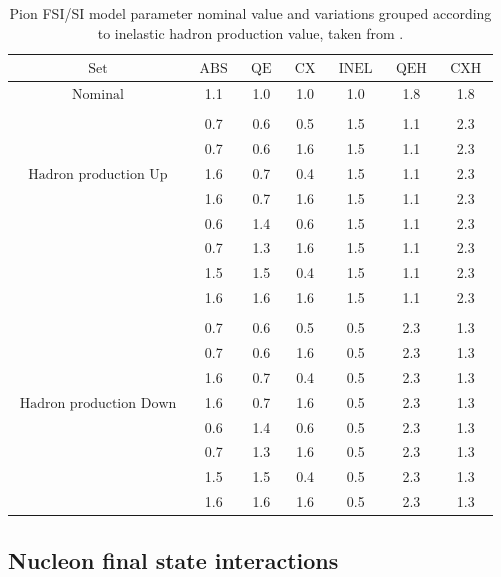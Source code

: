 \begin{table}
\centering
\begin{tabular}{||ccccccc||}
\hline
$\text { Set }$ & $\text { ABS }$ & $\text { QE }$ & $\text { CX }$ & $\text { INEL }$ & $\text { QEH }$ & $\text { CXH }$ \\
\hline
    $\text { Nominal }$ & 1.1 & 1.0 & 1.0 & 1.0 & 1.8 & 1.8 \\
    & & & & & & \\
    & 0.7 & 0.6 & 0.5 & 1.5 & 1.1 & 2.3 \\
    & 0.7 & 0.6 & 1.6 & 1.5 & 1.1 & 2.3 \\
    $\text { Hadron production Up }$ & 1.6 & 0.7 & 0.4 & 1.5 & 1.1 & 2.3 \\
    & 1.6 & 0.7 & 1.6 & 1.5 & 1.1 & 2.3 \\
    & 0.6 & 1.4 & 0.6 & 1.5 & 1.1 & 2.3 \\
    & 0.7 & 1.3 & 1.6 & 1.5 & 1.1 & 2.3 \\
    & 1.5 & 1.5 & 0.4 & 1.5 & 1.1 & 2.3 \\
    & 1.6 & 1.6 & 1.6 & 1.5 & 1.1 & 2.3 \\
    & & & & & & \\
    & 0.7 & 0.6 & 0.5 & 0.5 & 2.3 & 1.3 \\
    & 0.7 & 0.6 & 1.6 & 0.5 & 2.3 & 1.3 \\
    & 1.6 & 0.7 & 0.4 & 0.5 & 2.3 & 1.3 \\
    $\text { Hadron production Down }$ & 1.6 & 0.7 & 1.6 & 0.5 & 2.3 & 1.3 \\
    & 0.6 & 1.4 & 0.6 & 0.5 & 2.3 & 1.3 \\
    & 0.7 & 1.3 & 1.6 & 0.5 & 2.3 & 1.3 \\
    & 1.5 & 1.5 & 0.4 & 0.5 & 2.3 & 1.3 \\
    & 1.6 & 1.6 & 1.6 & 0.5 & 2.3 & 1.3\\
\hline
\end{tabular}
\caption{Pion FSI/SI model parameter nominal value and variations grouped according to inelastic hadron production value, taken from \cite{tn_32}.}
\label{table:fsimodelparameters}
\end{table}

\subsection{Nucleon final state interactions}

